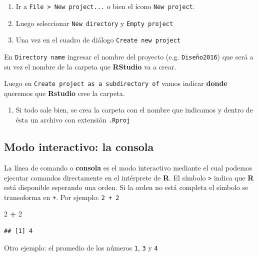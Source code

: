 \documentclass[a4paper]{book}
\newenvironment{Shaded}{\begin{snugshade}}{\end{snugshade}}
\newcommand{\DecValTok}[1]{\textcolor[rgb]{0.00,0.00,0.81}{#1}}
\newcommand{\OperatorTok}[1]{\textcolor[rgb]{0.81,0.36,0.00}{\textbf{#1}}}
\newcommand{\StringTok}[1]{\textcolor[rgb]{0.31,0.60,0.02}{#1}}
\providecommand{\tightlist}{%
  \setlength{\itemsep}{0pt}\setlength{\parskip}{0pt}}
\begin{document}
\begin{enumerate}
\def\labelenumi{\arabic{enumi}.}
\item
  Ir a \texttt{File\ \textgreater{}\ New\ project...} o bien el ícono
  \texttt{New\ project}.
\item
  Luego seleccionar \texttt{New\ directory} y \texttt{Empty\ project}
\item
  Una vez en el cuadro de diálogo \texttt{Create\ new\ project}
\end{enumerate}

En \texttt{Directory\ name} ingresar el nombre del proyecto (e.g.
\texttt{Diseño2016}) que será a su vez el nombre de la carpeta que
\textbf{RStudio} va a crear.

Luego en \texttt{Create\ project\ as\ a\ subdirectory\ of} vamos indicar
\textbf{donde} queremos que \textbf{Rstudio} cree la carpeta.

\begin{enumerate}
\def\labelenumi{\arabic{enumi}.}
\setcounter{enumi}{3}
\tightlist
\item
  Si todo sale bien, se crea la carpeta con el nombre que indicamos y
  dentro de ésta un archivo con extensión \texttt{.Rproj}
\end{enumerate}

\hypertarget{modo-interactivo-la-consola}{%
\subsection{Modo interactivo: la
consola}\label{modo-interactivo-la-consola}}

La línea de comando o \textbf{consola} es el modo interactivo mediante
el cual podemos ejecutar comandos directamente en el intérprete de
\textbf{R}. El símbolo \texttt{\textgreater{}} indica que \textbf{R}
está disponible esperando una orden. Si la orden no está completa el
símbolo se transoforma en \texttt{+}. Por ejemplo: \texttt{2\ +\ 2}

\begin{Shaded}
\begin{Highlighting}[]
\DecValTok{2} \OperatorTok{+}\StringTok{ }\DecValTok{2}
\end{Highlighting}
\end{Shaded}

\begin{verbatim}
## [1] 4
\end{verbatim}

Otro ejemplo: el promedio de los números \texttt{1}, \texttt{3} y
\texttt{4}
\end{document}
